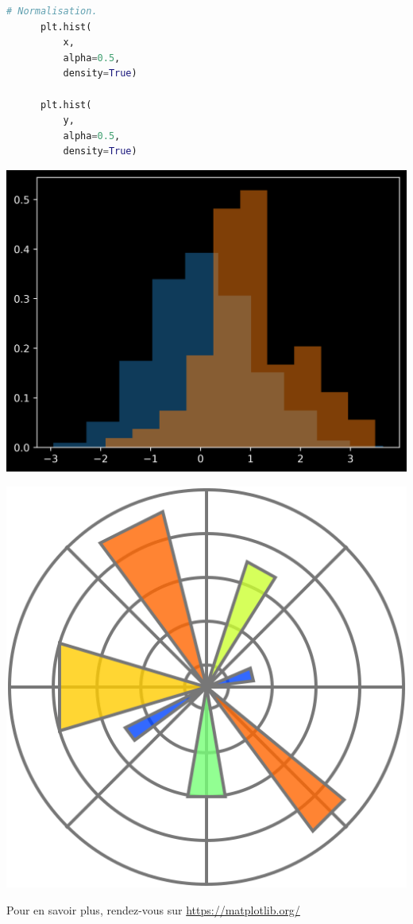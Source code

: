 \documentclass[aspectratio=169]{beamer}
\begin{document}
\begin{frame}[fragile]{}{}
  \vfill
  \begin{minipage}{.48\textwidth}
    \begin{lstlisting}[language=Python]
      # Normalisation.
      plt.hist(
          x,
          alpha=0.5,
          density=True)

      plt.hist(
          y,
          alpha=0.5,
          density=True)
    \end{lstlisting}
  \end{minipage}%
  \hfill
  \begin{minipage}{.48\textwidth}
    \centering
    \includegraphics[width=\textwidth]{hist_plot_density}
  \end{minipage}
  \vfill
\end{frame}


\begin{frame}
  \centering

  \includegraphics[width=.15\textwidth]{matplotlib_logo}

  Pour en savoir plus, rendez-vous sur \url{https://matplotlib.org/}
\end{frame}
\end{document}
